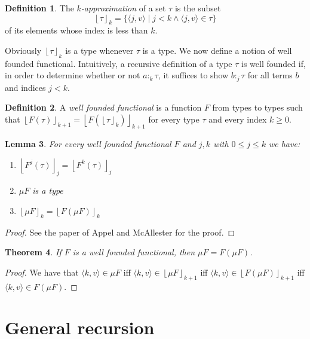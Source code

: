 \documentclass[12pt,a4paper,draft]{article}
\theoremstyle{definition}
\newtheorem{definition}{Definition}
\theoremstyle{plain}
\newtheorem{lemma}[definition]{Lemma}
\newtheorem{theorem}[definition]{Theorem}
\newcommand{\pair}[1]{\ensuremath{\langle{#1}\rangle}}
\newcommand{\floor}[1]{\ensuremath{\left\lfloor{#1}\right\rfloor}}
\begin{document}
\begin{definition} \label{def:Approximation}
  The \emph{$k$-approximation} of a set $\tau$ is the subset
  \[ \floor{\tau}_k = \{ \pair{j,v} \mid j < k \wedge \pair{j,v} \in \tau \} \]
  of its elements whose index is less than $k$.
\end{definition}

Obviously $\floor{\tau}_k$ is a type whenever $\tau$ is a type. We now define a notion of well founded
functional. Intuitively, a recursive definition of a type $\tau$ is well founded if, in order to determine
whether or not $a :_k \tau$, it suffices to show $b :_j \tau$ for all terms $b$ and indices $j < k$.

\begin{definition}
  A \emph{well founded functional} is a function $F$ from types to types such that
  $\floor{F\left(\tau\right)}_{k+1} = \floor{F\left(\floor{\tau}_k\right)}_{k+1}$
  for every type $\tau$ and every index $k \ge 0$.
\end{definition}

\begin{lemma}
  For every well founded functional $F$ and $j, k$ with $0 \le j \le k$ we have:
  \begin{enumerate}
  \item $\floor{F^j\left(\tau\right)}_j = \floor{F^k\left(\tau\right)}_j$
  \item $\mu F$ is a type
  \item $\floor{\mu F}_k = \floor{F \left(\mu F\right)}_k$
  \end{enumerate}
\end{lemma}

\begin{proof}
  See the paper of Appel and McAllester \cite{Appel01} for the proof.
\end{proof}

\begin{theorem} \label{thm:Well_founded_fixpoint}
  If $F$ is a well founded functional, then $\mu F = F(\mu F)$.
\end{theorem}

\begin{proof}
  We have that $\pair{k,v} \in \mu F$ iff $\pair{k,v} \in \floor{\mu F}_{k+1}$
  iff $\pair{k,v} \in \floor{F \left(\mu F\right)}_{k+1}$ iff
  $\pair{k,v} \in F \left(\mu F\right)$.
\end{proof}


\section{General recursion}
\label{sec:General_recursion}
\end{document}
